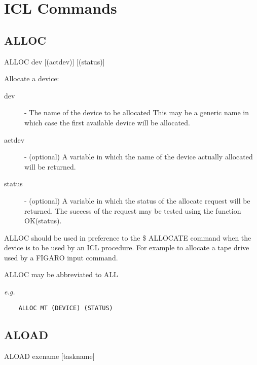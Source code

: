 \documentclass[twoside,11pt]{report}
\newcommand{\xlabel}[1]{}
\begin{document}
\chapter{\xlabel{icl_commands}ICL Commands}

\section{\xlabel{alloc}ALLOC}



    ALLOC \hspace{.5cm} dev \hspace{.5cm} [(actdev)] \hspace{.5cm} [(status)]

    Allocate a device:
\begin{description}

\item[dev] - The name of the device to be allocated
            This may be a generic name in which case the first
            available device will be allocated.

\item[actdev] - (optional) A variable in which the name of the
            device actually allocated will be returned.

\item[status] - (optional) A variable in which the status of
            the allocate request will be returned. The success of
            the request may be tested using the function OK(status).

\end{description}

  ALLOC should be used in preference to the \$ ALLOCATE command when
  the device is to be used by an ICL procedure. For example to allocate
  a tape drive used by a FIGARO input command.

  ALLOC may be abbreviated to ALL

{\em e.g. }
\begin{verbatim}
    ALLOC MT (DEVICE) (STATUS)
\end{verbatim}

\section{\xlabel{ALOAD}ALOAD\label{ALOAD}}


    ALOAD \hspace{.5cm} exename \hspace{.5cm} [taskname]
\end{document}

